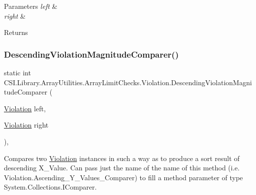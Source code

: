 \begin{DoxyParams}{Parameters}
{\em left} & \\
\hline
{\em right} & \\
\hline
\end{DoxyParams}
\begin{DoxyReturn}{Returns}

\end{DoxyReturn}
\mbox{\label{class_c_s_i_1_1_library_1_1_array_utilities_1_1_array_limit_checks_1_1_violation_a70554b24254c91c11e3eb63ba75f902c}} 
\subsubsection{\texorpdfstring{DescendingViolationMagnitudeComparer()}{DescendingViolationMagnitudeComparer()}}
{\footnotesize\ttfamily static int C\+S\+I.\+Library.\+Array\+Utilities.\+Array\+Limit\+Checks.\+Violation.\+Descending\+Violation\+Magnitude\+Comparer (\begin{DoxyParamCaption}\item[{\mbox{\hyperlink{class_c_s_i_1_1_library_1_1_array_utilities_1_1_array_limit_checks_1_1_violation}{Violation}}}]{left,  }\item[{\mbox{\hyperlink{class_c_s_i_1_1_library_1_1_array_utilities_1_1_array_limit_checks_1_1_violation}{Violation}}}]{right }\end{DoxyParamCaption})\hspace{0.3cm}{\ttfamily [inline]}, {\ttfamily [static]}}



Compares two \mbox{\hyperlink{class_c_s_i_1_1_library_1_1_array_utilities_1_1_array_limit_checks_1_1_violation}{Violation}} instances in such a way as to produce a sort result of descending X\+\_\+\+Value. Can pass just the name of the name of this method (i.\+e. Violation.\+Ascending\+\_\+\+Y\+\_\+\+Values\+\_\+\+Comparer) to fill a method parameter of type System.\+Collections.\+I\+Comparer. 


